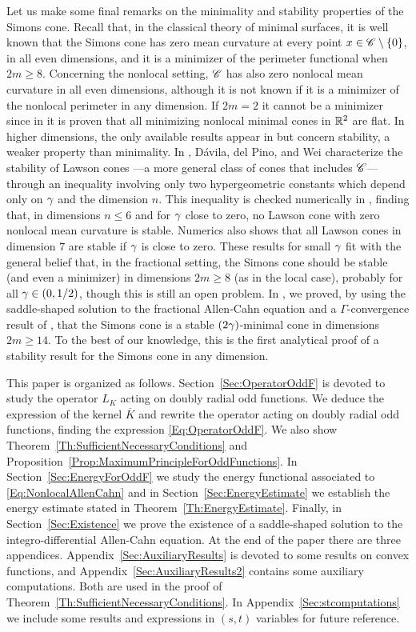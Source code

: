 Let us make some final remarks on the minimality and stability properties of the Simons cone. Recall that, in the classical theory of minimal surfaces, it is well known that the Simons cone has zero mean curvature at every point $x\in \mathscr{C} \setminus \{0\}$, in all even dimensions, and it is a minimizer of the perimeter functional when $2m\geq 8$. Concerning the nonlocal setting, $\mathscr{C}$ has also zero nonlocal mean curvature in all even dimensions, although it is not known if it is a minimizer of the nonlocal perimeter in any dimension. If $2m=2$ it cannot be a minimizer since in \cite{SavinValdinoci-Cones} it is proven that all minimizing nonlocal minimal cones in $\mathbb{R}^2$ are flat. In higher dimensions, the only available results appear in \cite{DaviladelPinoWei, Felipe-Sanz-Perela:SaddleFractional} but concern stability, a weaker property than minimality. In \cite{DaviladelPinoWei},  Dávila, del Pino, and Wei characterize the stability of Lawson cones ---a more general class of cones that includes $\mathscr{C}$--- through an inequality involving only two hypergeometric constants which depend only on $\gamma$ and the dimension $n$. This inequality is checked numerically in \cite{DaviladelPinoWei}, finding that, in dimensions $n \leq 6$ and for $\gamma$ close to zero, no Lawson cone with zero nonlocal mean curvature is stable. Numerics also shows that all Lawson cones in dimension $7$ are stable if $\gamma$ is close to zero. These results for small $\gamma$ fit with the general belief that, in the fractional setting, the Simons cone should be stable (and even a minimizer) in dimensions $2m \geq 8$ (as in the local case), probably for all $\gamma\in(0,1/2)$, though this is still an open problem. In \cite{Felipe-Sanz-Perela:SaddleFractional}, we proved, by using the saddle-shaped solution to the fractional Allen-Cahn equation and a $\Gamma$-convergence result of \cite{CabreCintiSerra-Stable}, that the Simons cone is a stable $(2\gamma)$-minimal cone in dimensions $2m\geq 14$. To the best of our knowledge, this is the first analytical proof of a stability result for the Simons cone in any dimension.



This paper is organized as follows. Section~\ref{Sec:OperatorOddF} is devoted to study the operator $L_K$ acting on doubly radial odd functions. We deduce the expression of the kernel $\overline{K}$ and rewrite the operator acting on doubly radial odd functions, finding the expression \eqref{Eq:OperatorOddF}. We also show Theorem~\ref{Th:SufficientNecessaryConditions} and Proposition~\ref{Prop:MaximumPrincipleForOddFunctions}. In Section~\ref{Sec:EnergyForOddF} we study the energy functional associated to \eqref{Eq:NonlocalAllenCahn} and in Section~\ref{Sec:EnergyEstimate} we establish the energy estimate stated in Theorem~\ref{Th:EnergyEstimate}. Finally, in Section~\ref{Sec:Existence} we prove the existence of a saddle-shaped solution to the integro-differential Allen-Cahn equation. At the end of the paper there are three appendices. Appendix~\ref{Sec:AuxiliaryResults} is devoted to some results on convex functions, and Appendix~\ref{Sec:AuxiliaryResults2} contains some auxiliary computations. Both are used in the proof of Theorem~\ref{Th:SufficientNecessaryConditions}. In Appendix~\ref{Sec:stcomputations} we include some results and expressions in $(s,t)$ variables for future reference.